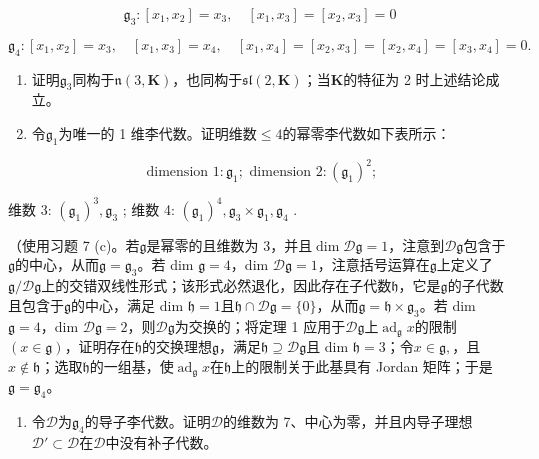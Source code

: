 \[
\mathfrak {g} _ {3}: \left[ x _ {1}, x _ {2} \right] = x _ {3}, \quad \left[ x _ {1}, x _ {3} \right] = \left[ x _ {2}, x _ {3} \right] = 0
\]

\[
\mathfrak {g} _ {4}: \left[ x _ {1}, x _ {2} \right] = x _ {3}, \quad \left[ x _ {1}, x _ {3} \right] = x _ {4}, \quad \left[ x _ {1}, x _ {4} \right] = \left[ x _ {2}, x _ {3} \right] = \left[ x _ {2}, x _ {4} \right] = \left[ x _ {3}, x _ {4} \right] = 0.
\]

\begin{enumerate}
\def\labelenumi{(\alph{enumi})}
\setcounter{enumi}{1}
\item
  证明\(\mathfrak{g}_3\)同构于\(\mathfrak{n}(3, \mathbf{K})\)，也同构于\(\mathfrak{sl}(2, \mathbf{K})\)；当\(\mathbf{K}\)的特征为 2 时上述结论成立。
\item
  令\(\mathfrak{g}_1\)为唯一的 1 维李代数。证明维数\(\leqslant 4\)的幂零李代数如下表所示：
\end{enumerate}

\[
\text { dimension } 1: \mathfrak {g} _ {1}; \text { dimension } 2: (\mathfrak {g} _ {1}) ^ {2};
\]

维数 3: \((\mathfrak{g}_1)^3, \mathfrak{g}_3\) ; 维数 4: \((\mathfrak{g}_1)^4, \mathfrak{g}_3 \times \mathfrak{g}_1, \mathfrak{g}_4\) .

（使用习题 7 (c)。若\(\mathfrak{g}\)是幂零的且维数为 3，并且\(\dim \mathcal{D}\mathfrak{g} = 1\)，注意到\(\mathcal{D}\mathfrak{g}\)包含于\(\mathfrak{g}\)的中心，从而\(\mathfrak{g} = \mathfrak{g}_3\)。若 dim \(\mathfrak{g} = 4\)，dim \(\mathcal{D}\mathfrak{g} = 1\)，注意括号运算在\(\mathfrak{g}\)上定义了\(\mathfrak{g} / \mathcal{D}\mathfrak{g}\)上的交错双线性形式；该形式必然退化，因此存在子代数\(\mathfrak{h}\)，它是\(\mathfrak{g}\)的子代数且包含于\(\mathfrak{g}\)的中心，满足 dim \(\mathfrak{h} = 1\)且\(\mathfrak{h}\cap \mathcal{D}\mathfrak{g} = \{0\}\)，从而\(\mathfrak{g} = \mathfrak{h}\times \mathfrak{g}_3\)。若 dim \(\mathfrak{g} = 4\)，dim \(\mathcal{D}\mathfrak{g} = 2\)，则\(\mathcal{D}\mathfrak{g}\)为交换的；将定理 1 应用于\(\mathcal{D}\mathfrak{g}\)上\(\operatorname{ad}_{\mathfrak{g}} x\)的限制\((x\in \mathfrak{g})\)，证明存在\(\mathfrak{h}\)的交换理想\(\mathfrak{g}\)，满足\(\mathfrak{h}\supseteq \mathcal{D}\mathfrak{g}\)且 dim \(\mathfrak{h} = 3\)；令\(x\in \mathfrak{g},\)，且\(x\notin \mathfrak{h}\)；选取\(\mathfrak{h}\)的一组基，使\(\operatorname{ad}_{\mathfrak{g}}x\)在\(\mathfrak{h}\)上的限制关于此基具有 Jordan 矩阵；于是\(\mathfrak{g} = \mathfrak{g}_4\)。

\begin{enumerate}
\def\labelenumi{\arabic{enumi}.}
\setcounter{enumi}{9}
\tightlist
\item
  令\(\mathcal{D}\)为\(\mathfrak{g}_4\)的导子李代数。证明\(\mathcal{D}\)的维数为 7、中心为零，并且内导子理想\(\mathcal{D}' \subset \mathcal{D}\)在\(\mathcal{D}\)中没有补子代数。
\end{enumerate}

